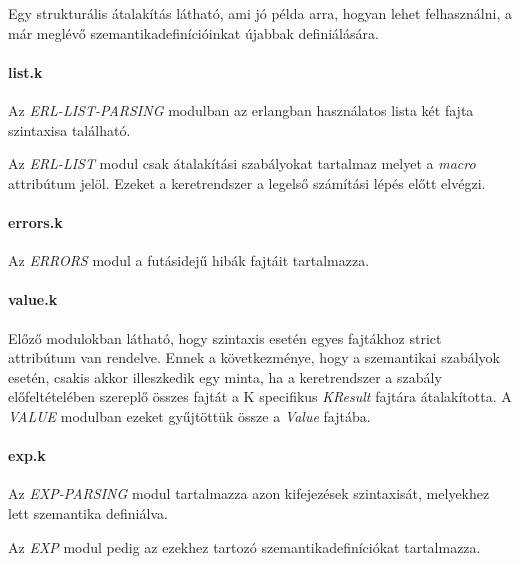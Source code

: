 

Egy strukturális átalakítás látható, ami jó példa arra, hogyan lehet felhasználni, a már meglévő szemantikadefinícióinkat újabbak definiálására.

\paragraph{list.k}

Az \textit{ERL-LIST-PARSING} modulban az erlangban használatos lista két fajta szintaxisa található.



Az \textit{ERL-LIST} modul csak átalakítási szabályokat tartalmaz melyet a \textit{macro} attribútum jelöl. Ezeket a keretrendszer a legelső számítási lépés előtt elvégzi.



\paragraph{errors.k}

Az \textit{ERRORS} modul a futásidejű hibák fajtáit tartalmazza.



\paragraph{value.k}

Előző modulokban látható, hogy szintaxis esetén egyes fajtákhoz strict attribútum van rendelve. Ennek a következménye, hogy a szemantikai szabályok esetén, csakis akkor illeszkedik egy minta, ha a keretrendszer a szabály előfeltételében szereplő összes fajtát a K specifikus \textit{KResult} fajtára átalakította. A \textit{VALUE} modulban ezeket gyűjtöttük össze a \textit{Value} fajtába.



\paragraph{exp.k}

Az \textit{EXP-PARSING} modul tartalmazza azon kifejezések szintaxisát, melyekhez lett szemantika definiálva.



Az \textit{EXP} modul pedig az ezekhez tartozó szemantikadefiníciókat tartalmazza.

